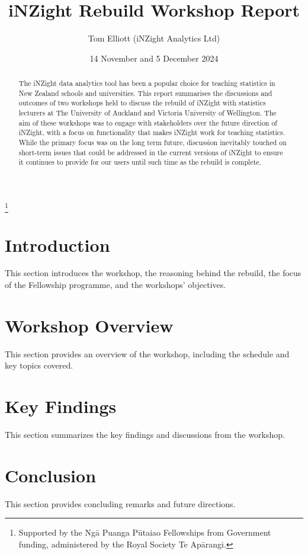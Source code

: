 \documentclass{article}
\title{iNZight Rebuild Workshop Report}
\author{Tom Elliott (iNZight Analytics Ltd)}
\date{14 November and 5 December 2024}
\begin{document}
\begin{titlepage}
    \maketitle

    \begin{abstract}
        The iNZight data analytics tool has been a popular choice for teaching statistics in New Zealand schools and universities. This report summarises the discussions and outcomes of two workshops held to discuss the rebuild of iNZight with statistics lecturers at The University of Auckland and Victoria University of Wellington. The aim of these workshops was to engage with stakeholders over the future direction of iNZight, with a focus on functionality that makes iNZight work for teaching statistics. While the primary focus was on the long term future, discussion inevitably touched on short-term issues that could be addressed in the current versions of iNZight to ensure it continues to provide for our users until such time as the rebuild is complete.
    \end{abstract}

    \vfill

    \centering
    \thanks{\noindent Supported by the Ngā Puanga Pūtaiao Fellowships from
    Government funding, administered by the Royal Society Te Apārangi.}
\end{titlepage}


\section{Introduction}
This section introduces the workshop, the reasoning behind the rebuild, the focus of the Fellowship programme, and the workshops' objectives.

\section{Workshop Overview}
This section provides an overview of the workshop, including the schedule and key topics covered.

\section{Key Findings}
This section summarizes the key findings and discussions from the workshop.

\section{Conclusion}
This section provides concluding remarks and future directions.
\end{document}
